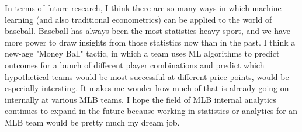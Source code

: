 \documentclass[12pt]{article}
\begin{document}
In terms of future research, I think there are so many ways in which machine learning (and also traditional econometrics) can be applied to the world of baseball. Baseball has always been the most statistics-heavy sport, and we have more power to draw insights from those statistics now than in the past. I think a new-age "Money Ball" tactic, in which a team uses ML algorithms to predict outcomes for a bunch of different player combinations and predict which hypothetical teams would be most successful at different price points, would be especially intersting. It makes me wonder how much of that is already going on internally at various MLB teams. I hope the field of MLB internal analytics continues to expand in the future because working in statistics or analytics for an MLB team would be pretty much my dream job. 

\end{document}
